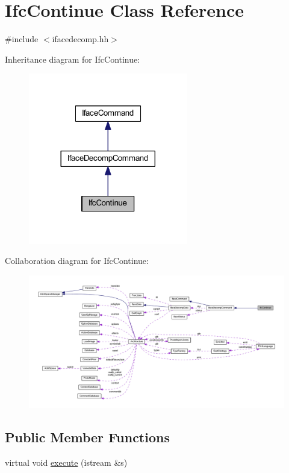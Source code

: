 \hypertarget{class_ifc_continue}{}\section{Ifc\+Continue Class Reference}
\label{class_ifc_continue}


{\ttfamily \#include $<$ifacedecomp.\+hh$>$}



Inheritance diagram for Ifc\+Continue\+:
\nopagebreak
\begin{figure}[H]
\begin{center}
\leavevmode
\includegraphics[width=197pt]{class_ifc_continue__inherit__graph}
\end{center}
\end{figure}


Collaboration diagram for Ifc\+Continue\+:
\nopagebreak
\begin{figure}[H]
\begin{center}
\leavevmode
\includegraphics[width=350pt]{class_ifc_continue__coll__graph}
\end{center}
\end{figure}
\subsection*{Public Member Functions}
\begin{DoxyCompactItemize}
\item 
virtual void \mbox{\hyperlink{class_ifc_continue_a422d9ffe63d6c9cea18cd8e494b7e6fb}{execute}} (istream \&s)
\end{DoxyCompactItemize}
